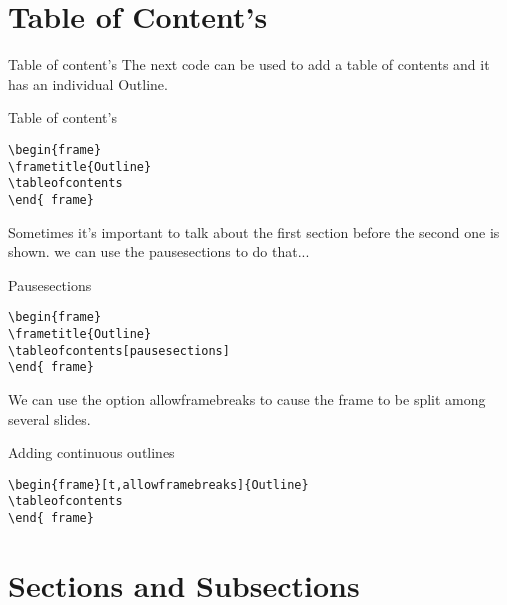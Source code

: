 \documentclass[10pt,xcolor=x11names]{beamer}
\begin{document}
\section{Table of Content's}

\begin{frame} {Table of content's}
The next code can be used to add a table of contents and it has an individual \alert{Outline}.
\begin{exampleblock}{Table of content's}

	\begin{verbatim}
\begin{frame}
\frametitle{Outline}
\tableofcontents
\end{ frame}
	\end{verbatim}
		
\end{exampleblock}

Sometimes it's important to talk about the first
section before the second one is shown. we can use the \alert{pausesections} to do that...

\vspace{40pt}
\begin{exampleblock}{Pausesections}
	   \begin{verbatim}
\begin{frame}
\frametitle{Outline}
\tableofcontents[pausesections]
\end{ frame}
	   \end{verbatim}
\end{exampleblock}

We can use the option \alert{allowframebreaks} to cause the frame to be split among several slides.
\vspace{60pt}
\begin{exampleblock}{Adding continuous outlines}
	\begin{verbatim}
\begin{frame}[t,allowframebreaks]{Outline}
\tableofcontents
\end{ frame}
	\end{verbatim}
\end{exampleblock}

\end{frame}

\section{Sections and Subsections}
\end{document}
